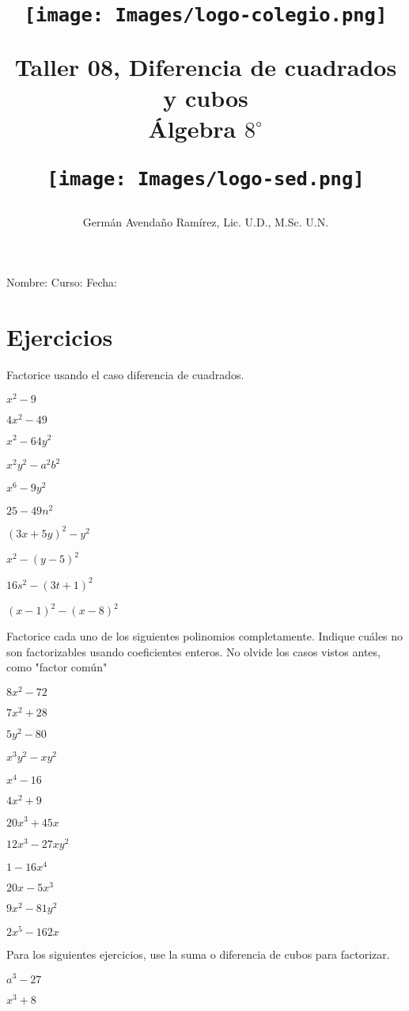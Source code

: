 \documentclass[10pt,twoside]{article}
\author{Germ\'an Avenda\~no Ram\'irez, Lic. U.D., M.Sc. U.N.}
\title{\begin{minipage}{.2\textwidth}
\texttt{[image: Images/logo-colegio.png]}\end{minipage}
\begin{minipage}{.55\textwidth}
\begin{center}
Taller 08, Diferencia de cuadrados y cubos\\
Álgebra $8^{\circ}$
\end{center}
\end{minipage}\hfill
\begin{minipage}{.2\textwidth}
\texttt{[image: Images/logo-sed.png]} 
\end{minipage}}
\date{}
\begin{document}
\maketitle
Nombre: \hrulefill Curso: \underline{\hspace*{44pt}} Fecha: \underline{\hspace*{2.5cm}}
\section*{Ejercicios}
Factorice usando el caso diferencia de cuadrados.
\begin{enumerate}
\begin{multicols}{2}
\item $x^{2}-9$
\item $4x^{2}-49$
\item $x^{2}-64y^{2}$
\item $x^{2}y^{2}-a^{2}b^{2}$
\item $x^{6}-9y^{2}$
\item $25-49n^{2}$
\item $(3x+5y)^{2}-y^{2}$
\item $x^{2}-(y-5)^{2}$
\item $16s^{2}-(3t+1)^{2}$
\item $(x-1)^{2}-(x-8)^{2}$
\end{multicols}
Factorice cada uno de los siguientes polinomios completamente. Indique cuáles no son factorizables usando coeficientes enteros. No olvide los casos vistos antes, como "factor común"
\begin{multicols}{2}
\item $8x^{2}-72$
\item $7x^{2}+28$
\item $5y^{2}-80$
\item $x^{3}y^{2}-xy^{2}$
\item $x^{4}-16$
\item $4x^{2}+9$
\item $20x^{3}+45x$
\item $12x^{3}-27xy^{2}$
\item $1-16x^{4}$
\item $20x-5x^{3}$
\item $9x^{2}-81y^{2}$
\item $2x^{5}-162x$
\end{multicols}
Para los siguientes ejercicios, use la suma o diferencia de cubos para factorizar.
\begin{multicols}{2}
\item $a^{3}-27$
\item $x^{3}+8$

\end{multicols}
\end{enumerate}
\end{document}
